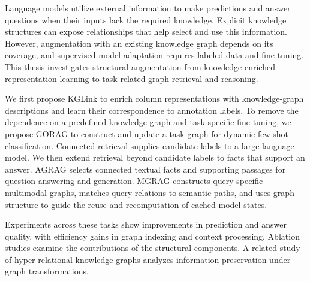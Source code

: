 Language models utilize external information to make predictions and answer questions when their inputs lack the required knowledge. Explicit knowledge structures can expose relationships that help select and use this information. However, augmentation with an existing knowledge graph depends on its coverage, and supervised model adaptation requires labeled data and fine-tuning. This thesis investigates structural augmentation from knowledge-enriched representation learning to task-related graph retrieval and reasoning.

We first propose KGLink to enrich column representations with knowledge-graph descriptions and learn their correspondence to annotation labels. To remove the dependence on a predefined knowledge graph and task-specific fine-tuning, we propose GORAG to construct and update a task graph for dynamic few-shot classification. Connected retrieval supplies candidate labels to a large language model. We then extend retrieval beyond candidate labels to facts that support an answer. AGRAG selects connected textual facts and supporting passages for question answering and generation. MGRAG constructs query-specific multimodal graphs, matches query relations to semantic paths, and uses graph structure to guide the reuse and recomputation of cached model states.

Experiments across these tasks show improvements in prediction and answer quality, with efficiency gains in graph indexing and context processing. Ablation studies examine the contributions of the structural components. A related study of hyper-relational knowledge graphs analyzes information preservation under graph transformations.

